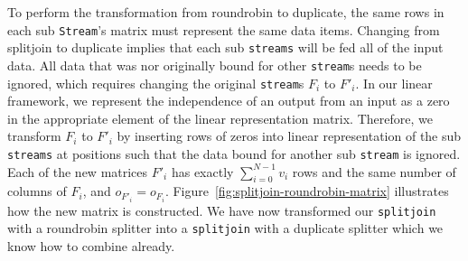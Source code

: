 To perform the transformation from roundrobin to duplicate, the same rows
in each sub {\tt Stream}'s matrix must represent the same data items. Changing from splitjoin to 
duplicate implies that each sub {\tt streams} will be fed all of the input data. All data
that was nor originally bound for other {\tt stream}s needs to be ignored, which requires
changing the original {\tt stream}s $F_i$ to $F'_i$. In our linear
framework, we represent the independence of an output from an input as a zero in the appropriate
element of the linear representation matrix. Therefore, we transform $F_i$ to $F'_i$ by inserting
rows of zeros into linear representation of the sub {\tt streams} at positions such that
the data bound for another sub {\tt stream} is ignored. Each of the new matrices $F'_i$ 
has exactly $\sum_{i=0}^{N-1}v_i$ rows and the same number of columns of $F_i$, and 
$o_{F'_i}=o_{F_i}$.
Figure~\ref{fig:splitjoin-roundrobin-matrix} illustrates how the new matrix is constructed.
We have now transformed our {\tt splitjoin} with a roundrobin splitter into a {\tt splitjoin}
with a duplicate splitter which we know how to combine already.

